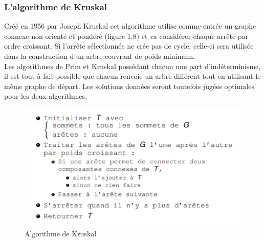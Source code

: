 \documentclass[memoire.tex]{subfiles}
\begin{document}
\subsubsection{L’algorithme de Kruskal}
Créé en 1956  par  Joseph Kruskal  cet algorithme utilise comme entrée un graphe connexe non orienté et pondéré (figure 1.8) et va considérer chaque arrête par ordre croissant. Si l’arrête sélectionnée ne crée pas de cycle, celle-ci sera utilisée dans la construction d’un arbre couvrant de poids minimum.\\
Les algorithmes de Prim et Kruskal possédant chacun une part d’indéterminisme, il est tout à fait possible que chacun renvoie un arbre différent tout en utilisant le même graphe de départ. Les solutions données seront toutefois jugées optimales pour les deux algorithmes.
	\begin{figure}[h!]
		\centerline{\includegraphics[scale=0.8]{img/kruskal.png}}
		\caption{Algorithme de Kruskal}
	\end{figure}
\newpage
\end{document}
